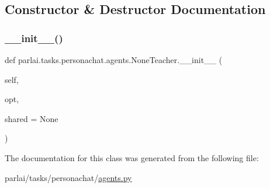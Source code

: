 \subsection{Constructor \& Destructor Documentation}
\mbox{\label{classparlai_1_1tasks_1_1personachat_1_1agents_1_1NoneTeacher_af7f3226c57f6d0c8fce6d670b03a4c2a}} 
\subsubsection{\texorpdfstring{\+\_\+\+\_\+init\+\_\+\+\_\+()}{\_\_init\_\_()}}
{\footnotesize\ttfamily def parlai.\+tasks.\+personachat.\+agents.\+None\+Teacher.\+\_\+\+\_\+init\+\_\+\+\_\+ (\begin{DoxyParamCaption}\item[{}]{self,  }\item[{}]{opt,  }\item[{}]{shared = {\ttfamily None} }\end{DoxyParamCaption})}



The documentation for this class was generated from the following file\+:\begin{DoxyCompactItemize}
\item 
parlai/tasks/personachat/\hyperlink{parlai_2tasks_2personachat_2agents_8py}{agents.\+py}\end{DoxyCompactItemize}
